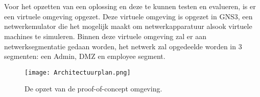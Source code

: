 \chapter{}%
\label{ch:proof-of-concept}
\section{}%
\label{sec:Virtuele_omgeving}

Voor het opzetten van een oplossing en deze te kunnen testen en evalueren, is er een virtuele omgeving opgezet.
Deze virtuele omgeving is opgezet in GNS3, een netwerkemulator die het mogelijk maakt om netwerkapparatuur alsook virtuele machines te simuleren.
Binnen deze virtuele omgeving zal er aan netwerksegmentatie gedaan worden, het netwerk zal opgedeelde worden in 3 segmenten: een Admin, DMZ en employee segment.

\begin{figure}
  \centering
  \texttt{[image: Architectuurplan.png]}
  \caption[Netwerkplan voor de proof-of-concept omgeving]{\label{fig:poc} De opzet van de proof-of-concept omgeving.}
\end{figure}



